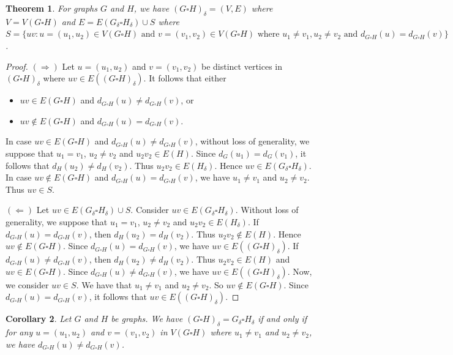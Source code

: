 \documentclass[12pt]{amsart}
\newtheorem{theorem}{Theorem}
\newtheorem{corollary}[theorem]{Corollary}
\begin{document}
\begin{theorem}\label{thm: cartesianEdge}
    For graphs $G$ and $H$, we have $(G\square H)_\delta=(V,E)$ where $V=V(G\square H)$ and $E=E(G_{\delta}\square H_{\delta})\cup S$ where $S=\{uv: u=(u_1,u_2)\in V(G\square H) \text{ and } v=(v_1,v_2)\in V(G\square H) \text{ where } u_1\neq v_1, u_2\neq v_2 \text{ and } d_{G\square H}(u)=d_{G\square H}(v)\}$.
\end{theorem}
\begin{proof}
$(\Longrightarrow)$ 
Let $u=(u_1,u_2)$ and $v=(v_1,v_2)$ be distinct vertices in $(G\square H)_\delta$ where $uv\in E((G\square H)_\delta)$.
    It follows that either 
    \begin{itemize}
        \item $uv\in E(G\square H)$ and $d_{G\square H}(u)\neq d_{G\square H}(v)$, or
        \item $uv\not\in E(G\square H)$ and $d_{G\square H}(u)=d_{G\square H}(v)$.
    \end{itemize}
    
In case $uv\in E(G\square H)$ and $d_{G\square H}(u)\neq d_{G\square H}(v)$, without loss of generality, we suppose that $u_1=v_1$, $u_2\neq v_2$ and $u_2v_2\in E(H)$.
Since $d_G(u_1)=d_G(v_1)$, it follows that $d_H(u_2)\neq d_H(v_2)$.
Thus $u_2v_2\in E(H_{\delta})$.
Hence $uv\in E(G_{\delta}\square H_{\delta})$.
In case $uv\not\in E(G\square H)$ and $d_{G\square H}(u)=d_{G\square H}(v)$, we have $u_1\neq v_1$ and $u_2\neq v_2$.
Thus $uv\in S$.

$(\Longleftarrow)$ Let $uv\in E(G_{\delta}\square H_{\delta})\cup S$.
Consider $uv\in E(G_{\delta}\square H_{\delta})$.
Without loss of generality, we suppose that $u_1=v_1$, $u_2\neq v_2$ and $u_2v_2\in E(H_{\delta})$.
If $d_{G\square H}(u)=d_{G\square H}(v)$, then $d_H(u_2)=d_H(v_2)$.
Thus $u_2v_2\not\in E(H)$.
Hence $uv\not\in E(G\square H)$.
Since $d_{G\square H}(u)=d_{G\square H}(v)$, we have $uv\in E((G\square H)_\delta)$.
If $d_{G\square H}(u)\neq d_{G\square H}(v)$, then $d_H(u_2)\neq d_H(v_2)$.
Thus $u_2v_2\in E(H)$ and $uv\in E(G\square H)$.
Since $d_{G\square H}(u)\neq d_{G\square H}(v)$, we have $uv\in E((G\square H)_\delta)$.
Now, we consider $uv\in S$.
We have that $u_1\neq v_1$ and $u_2\neq v_2$. So $uv\notin E(G\square H)$.
Since $d_{G\square H}(u)=d_{G\square H}(v)$, it follows that $uv\in E((G\square H)_\delta)$.
\end{proof}

\begin{corollary}
    Let $G$ and $H$ be graphs.
    We have $(G\square H)_\delta=G_{\delta}\square H_{\delta}$ if and only if
    for any $u=(u_1,u_2)$ and $v=(v_1,v_2)$ in $V(G\square H)$ where $u_1\neq v_1$ and $u_2\neq v_2$, we have $d_{G\square H}(u) \neq d_{G\square H}(v)$.
\end{corollary}
\end{document}
